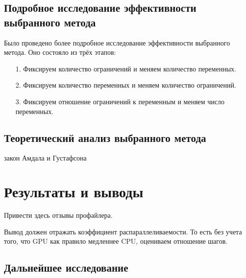 \documentclass[a4paper,14pt,russian]{extreport}
\begin{document}
\section{Подробное исследование эффективности выбранного метода}
Было проведено более подробное исследование эффективности выбранного метода. Оно состояло из трёх этапов:
\begin{enumerate}
\item[1.] Фиксируем количество ограничений и меняем количество переменных.
\item[2.] Фиксируем количество переменных и меняем количество ограничений.
\item[3.] Фиксируем отношение ограничений к переменным и меняем число переменных. 
\end{enumerate}
\par

\section{Теоретический анализ выбранного метода}
закон Амдала и Густафсона

\chapter{Результаты и выводы}
Привести здесь отзывы профайлера.
\par 
Вывод должен отражать коэффициент распараллеливаемости. То есть без учета того, что GPU как правило медленнее CPU, оцениваем отношение шагов. 

\section{Дальнейшее исследование}


 
\end{document}
